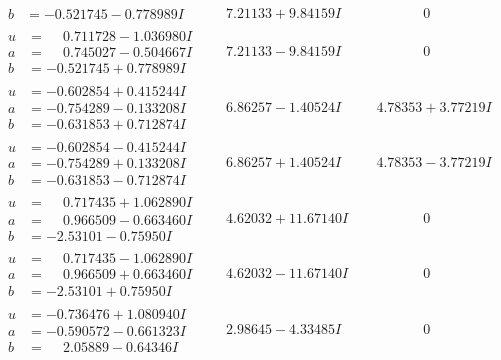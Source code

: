 \documentclass[1p]{elsarticle_modified}
\theoremstyle{definition}
\begin{document}
$$\begin{array}{c|c|c}
\begin{aligned}
b &= -0.521745 - 0.778989 I\end{aligned}
 & \phantom{-}7.21133 + 9.84159 I & \phantom{-0.000000 } 0 \\ \hline\begin{aligned}
u &= \phantom{-}0.711728 - 1.036980 I \\
a &= \phantom{-}0.745027 - 0.504667 I \\
b &= -0.521745 + 0.778989 I\end{aligned}
 & \phantom{-}7.21133 - 9.84159 I & \phantom{-0.000000 } 0 \\ \hline\begin{aligned}
u &= -0.602854 + 0.415244 I \\
a &= -0.754289 - 0.133208 I \\
b &= -0.631853 + 0.712874 I\end{aligned}
 & \phantom{-}6.86257 - 1.40524 I & \phantom{-}4.78353 + 3.77219 I \\ \hline\begin{aligned}
u &= -0.602854 - 0.415244 I \\
a &= -0.754289 + 0.133208 I \\
b &= -0.631853 - 0.712874 I\end{aligned}
 & \phantom{-}6.86257 + 1.40524 I & \phantom{-}4.78353 - 3.77219 I \\ \hline\begin{aligned}
u &= \phantom{-}0.717435 + 1.062890 I \\
a &= \phantom{-}0.966509 - 0.663460 I \\
b &= -2.53101 - 0.75950 I\end{aligned}
 & \phantom{-}4.62032 + 11.67140 I & \phantom{-0.000000 } 0 \\ \hline\begin{aligned}
u &= \phantom{-}0.717435 - 1.062890 I \\
a &= \phantom{-}0.966509 + 0.663460 I \\
b &= -2.53101 + 0.75950 I\end{aligned}
 & \phantom{-}4.62032 - 11.67140 I & \phantom{-0.000000 } 0 \\ \hline\begin{aligned}
u &= -0.736476 + 1.080940 I \\
a &= -0.590572 - 0.661323 I \\
b &= \phantom{-}2.05889 - 0.64346 I\end{aligned}
 & \phantom{-}2.98645 - 4.33485 I & \phantom{-0.000000 } 0 \\ \hline\begin{aligned}

\end{aligned}
\end{array}$$
\end{document}
